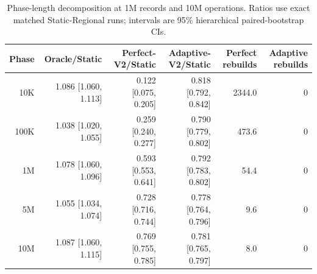 \begin{table}[t]
  \centering
  \caption{Phase-length decomposition at 1M records and 10M operations.
  Ratios use exact matched Static-Regional runs; intervals are 95\%
  hierarchical paired-bootstrap CIs.}
  \label{tab:phase-length-v2}
  \small
  \begin{tabular}{rrrrrr}
    \toprule
    Phase & Oracle/Static & Perfect-V2/Static & Adaptive-V2/Static &
    Perfect rebuilds & Adaptive rebuilds \\
    \midrule
    10K  & 1.086 [1.060, 1.113] & 0.122 [0.075, 0.205] & 0.818 [0.792, 0.842] & 2344.0 & 0 \\
    100K & 1.038 [1.020, 1.055] & 0.259 [0.240, 0.277] & 0.790 [0.779, 0.802] & 473.6  & 0 \\
    1M   & 1.078 [1.060, 1.096] & 0.593 [0.553, 0.641] & 0.792 [0.783, 0.802] & 54.4   & 0 \\
    5M   & 1.055 [1.034, 1.074] & 0.728 [0.716, 0.744] & 0.778 [0.764, 0.796] & 9.6    & 0 \\
    10M  & 1.087 [1.060, 1.115] & 0.769 [0.755, 0.785] & 0.781 [0.765, 0.797] & 8.0    & 0 \\
    \bottomrule
  \end{tabular}
\end{table}
